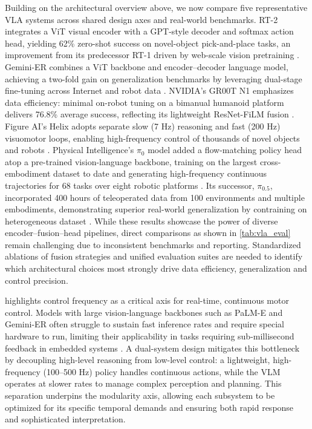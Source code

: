 Building on the architectural overview above, we now compare five representative \ac{VLA} systems across shared design axes and real-world benchmarks. RT-2 integrates a \ac{ViT} visual encoder with a \ac{GPT}-style decoder and softmax action head, yielding 62\% zero-shot success on novel-object pick-and-place tasks, an improvement from its predecessor RT-1 \cite{RT12022} driven by web-scale vision pretraining \cite{RT22023}. Gemini-ER combines a \ac{ViT} backbone and encoder–decoder language model, achieving a two-fold gain on generalization benchmarks by leveraging dual-stage fine-tuning across Internet and robot data \cite{GEMER2025}. NVIDIA's GR00T N1 emphasizes data efficiency: minimal on-robot tuning on a bimanual humanoid platform delivers 76.8\% average success, reflecting its lightweight ResNet-\ac{FiLM} fusion \cite{GR00T2025}. Figure AI’s Helix adopts separate slow (7 Hz) reasoning and fast (200 Hz) visuomotor loops, enabling high-frequency control of thousands of novel objects and robots \cite{HELIX2025}. Physical Intelligence’s $\pi_0$ model added a flow-matching policy head atop a pre-trained vision-language backbone, training on the largest cross-embodiment dataset to date and generating high-frequency continuous trajectories for 68 tasks over eight robotic platforms \cite{PI02024}. Its successor, $\pi_{0.5}$, incorporated 400 hours of teleoperated data from 100 environments and multiple embodiments, demonstrating superior real-world generalization by contraining on heterogeneous dataset \cite{PI0.52025}. While these results showcase the power of diverse encoder–fusion–head pipelines, direct comparisons as shown in \cref{tab:vla_eval} remain challenging due to inconsistent benchmarks and reporting. Standardized ablations of fusion strategies and unified evaluation suites are needed to identify which architectural choices most strongly drive data efficiency, generalization and control precision.

 highlights control frequency as a critical axis for real-time, continuous motor control. Models with large vision-language backbones such as PaLM-E and Gemini-ER often struggle to sustain fast inference rates and require special hardware to run, limiting their applicability in tasks requiring sub-millisecond feedback in embedded systems \cite{GEMER2025}. A dual-system design mitigates this bottleneck by decoupling high-level reasoning from low-level control: a lightweight, high-frequency (100–500 Hz) policy handles continuous actions, while the \ac{VLM} operates at slower rates to manage complex perception and planning. This separation underpins the modularity axis, allowing each subsystem to be optimized for its specific temporal demands and ensuring both rapid response and sophisticated interpretation.

